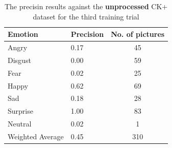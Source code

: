 \documentclass[runningheads,a4paper,11pt]{report}
\begin{document}
\begin{table}[htbp]
	\caption{The precisin results against the \textbf{unprocessed} CK+ dataset for the third training trial}
	\label{fer_training_28k_001_unprocessed_ckp}
		\begin{center}
			\begin{tabular}{p{110pt}p{110pt}c}
				\textbf{Emotion}& \textbf{Precision}& \textbf{No. of pictures} \\
				\hline\hline
				Angry& 0.17& 45 \\
				Disgust& 0.00& 59 \\
				Fear& 0.02& 25 \\
				Happy& 0.62& 69 \\
				Sad& 0.18& 28 \\
				Surprise& 1.00& 83 \\
				Neutral& 0.02& 1 \\
				\hline
				Weighted Average& 0.45& 310
			\end{tabular}
		\end{center}
\end{table}
\end{document}
